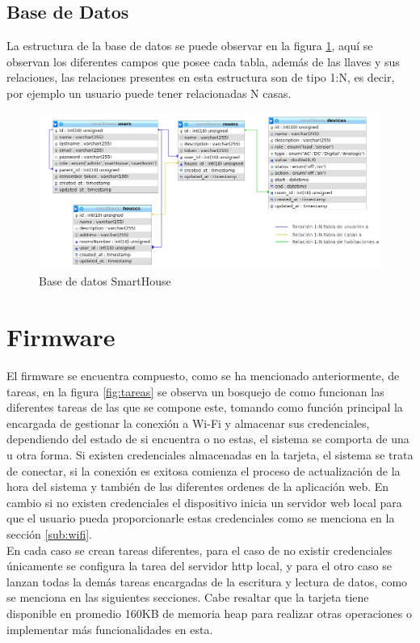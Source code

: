\subsection{Base de Datos}

La estructura de la base de datos se puede observar en la figura \ref{fig:db}, aquí se observan los diferentes campos que posee cada tabla, además de las llaves y sus relaciones, las relaciones presentes en esta estructura son de tipo 1:N, es decir, por ejemplo un usuario puede tener relacionadas N casas.

\begin{figure}[H]
\centering
\caption{Base de datos SmartHouse}
\label{fig:db}
\includegraphics[width=0.7\linewidth]{Imagenes/DB}
\end{figure}

\section{Firmware}

El firmware se encuentra compuesto, como se ha mencionado anteriormente, de tareas, en la figura \ref{fig:tareas} se observa un bosquejo de como funcionan las diferentes tareas de las que se compone este, tomando como función principal la encargada de gestionar la conexión a Wi-Fi y almacenar sus credenciales, dependiendo del estado de si encuentra o no estas, el sistema se comporta de una u otra forma. Si existen credenciales almacenadas en la tarjeta, el sistema se trata de conectar, si la conexión es exitosa comienza el proceso de actualización de la hora del sistema y también de las diferentes ordenes de la aplicación web. En cambio si no existen credenciales el dispositivo inicia un servidor web local para que el usuario pueda proporcionarle estas credenciales como se menciona en la sección \ref{sub:wifi}.\\

En cada caso se crean tareas diferentes, para el caso de no existir credenciales únicamente se configura la tarea del servidor http local, y para el otro caso se lanzan todas la demás tareas encargadas de la escritura y lectura de datos, como se menciona en las siguientes secciones. Cabe resaltar que la tarjeta tiene disponible en promedio 160KB de memoria heap para realizar otras operaciones o implementar más funcionalidades en esta.

